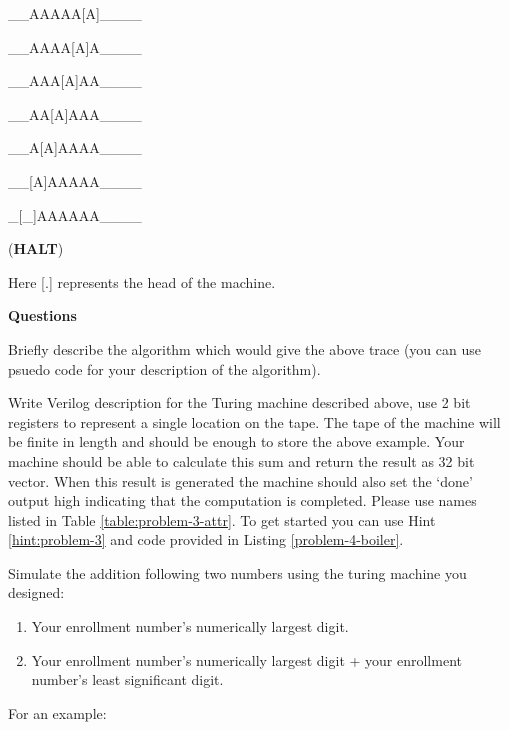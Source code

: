 \documentclass[a4paper,10pt]{article}
\theoremstyle{mytheor}
\newcommand{\problemheading}[1] {
  \vspace{0.3cm}

  {
    \setlength{\parindent}{0}
    \textbf{#1}
  }

  \vspace{0.05cm}
}
\begin{document}
{\begin{legal}
    \item \begin{textsc}\_\_AAAAA[A]\_\_\_\_\end{textsc}
    \item \begin{textsc}\_\_AAAA[A]A\_\_\_\_\end{textsc}
    \item \begin{textsc}\_\_AAA[A]AA\_\_\_\_\end{textsc}
    \item \begin{textsc}\_\_AA[A]AAA\_\_\_\_\end{textsc}
    \item \begin{textsc}\_\_A[A]AAAA\_\_\_\_\end{textsc}
    \item \begin{textsc}\_\_[A]AAAAA\_\_\_\_\end{textsc}
    \item \begin{textsc}\_[\_]AAAAAA\_\_\_\_\end{textsc} (\textbf{HALT})
    \end{legal}

    Here \textsc{[.]} represents the head of the machine.
    
    \problemheading{Questions}
    \begin{legal}
    \item Briefly describe the algorithm which would give the above
      trace (you can use psuedo code for your description of the
      algorithm).
    \item Write Verilog description for the Turing machine described
      above, use 2 bit registers to represent a single location on the
      tape. The tape of the machine will be finite in length and
      should be enough to store the above example. Your machine should
      be able to calculate this sum and return the result as 32 bit
      vector. When this result is generated the machine should also
      set the `done' output high indicating that the computation is
      completed. Please use names listed in Table
      \ref{table:problem-3-attr}. To get started you can use Hint
      \ref{hint:problem-3} and code provided in Listing
      \ref{problem-4-boiler}.
    \item Simulate the addition following two numbers using the turing
      machine you designed:
      \begin{enumerate}
      \item Your enrollment number's numerically largest digit.
      \item Your enrollment number's numerically largest digit + your
        enrollment number's least significant digit.
      \end{enumerate}
      For an example:


\end{legal}}
\end{document}
